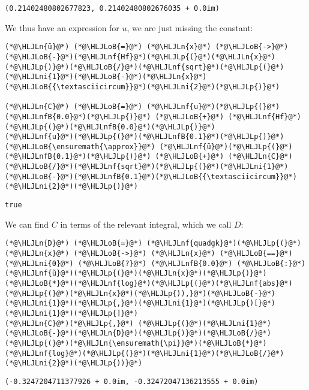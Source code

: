 \documentclass[12pt,landscape]{article}
\newcommand{\HLJLn}[1]{#1}
\newcommand{\HLJLnf}[1]{\textcolor[RGB]{66,102,213}{#1}}
\newcommand{\HLJLnfB}[1]{\textcolor[RGB]{59,151,46}{#1}}
\newcommand{\HLJLni}[1]{\textcolor[RGB]{59,151,46}{#1}}
\newcommand{\HLJLoB}[1]{\textcolor[RGB]{102,102,102}{\textbf{#1}}}
\newcommand{\HLJLp}[1]{#1}
\begin{document}
{\begin{lstlisting}
(0.21402480802677823, 0.21402480802676035 + 0.0im)
\end{lstlisting}


We thus have an expression for $u$, we are just missing the constant:


\begin{lstlisting}
(*@\HLJLn{ũ}@*) (*@\HLJLoB{=}@*) (*@\HLJLn{x}@*) (*@\HLJLoB{->}@*) (*@\HLJLoB{-}@*)(*@\HLJLnf{Hf}@*)(*@\HLJLp{(}@*)(*@\HLJLn{x}@*)(*@\HLJLp{)}@*)(*@\HLJLoB{/}@*)(*@\HLJLnf{sqrt}@*)(*@\HLJLp{(}@*)(*@\HLJLni{1}@*)(*@\HLJLoB{-}@*)(*@\HLJLn{x}@*)(*@\HLJLoB{{\textasciicircum}}@*)(*@\HLJLni{2}@*)(*@\HLJLp{)}@*)

(*@\HLJLn{C}@*) (*@\HLJLoB{=}@*) (*@\HLJLnf{u}@*)(*@\HLJLp{(}@*)(*@\HLJLnfB{0.0}@*)(*@\HLJLp{)}@*) (*@\HLJLoB{+}@*) (*@\HLJLnf{Hf}@*)(*@\HLJLp{(}@*)(*@\HLJLnfB{0.0}@*)(*@\HLJLp{)}@*)
(*@\HLJLnf{u}@*)(*@\HLJLp{(}@*)(*@\HLJLnfB{0.1}@*)(*@\HLJLp{)}@*) (*@\HLJLoB{\ensuremath{\approx}}@*) (*@\HLJLnf{ũ}@*)(*@\HLJLp{(}@*)(*@\HLJLnfB{0.1}@*)(*@\HLJLp{)}@*) (*@\HLJLoB{+}@*) (*@\HLJLn{C}@*)(*@\HLJLoB{/}@*)(*@\HLJLnf{sqrt}@*)(*@\HLJLp{(}@*)(*@\HLJLni{1}@*)(*@\HLJLoB{-}@*)(*@\HLJLnfB{0.1}@*)(*@\HLJLoB{{\textasciicircum}}@*)(*@\HLJLni{2}@*)(*@\HLJLp{)}@*)
\end{lstlisting}

\begin{lstlisting}
true
\end{lstlisting}


We can find $C$ in terms of the relevant integral, which we call $D$:


\begin{lstlisting}
(*@\HLJLn{D}@*) (*@\HLJLoB{=}@*) (*@\HLJLnf{quadgk}@*)(*@\HLJLp{(}@*)(*@\HLJLn{x}@*) (*@\HLJLoB{->}@*) (*@\HLJLn{x}@*) (*@\HLJLoB{==}@*) (*@\HLJLni{0}@*) (*@\HLJLoB{?}@*) (*@\HLJLnfB{0.0}@*) (*@\HLJLoB{:}@*) (*@\HLJLnf{ũ}@*)(*@\HLJLp{(}@*)(*@\HLJLn{x}@*)(*@\HLJLp{)}@*)(*@\HLJLoB{*}@*)(*@\HLJLnf{log}@*)(*@\HLJLp{(}@*)(*@\HLJLnf{abs}@*)(*@\HLJLp{(}@*)(*@\HLJLn{x}@*)(*@\HLJLp{)),}@*)(*@\HLJLoB{-}@*)(*@\HLJLni{1}@*)(*@\HLJLp{,}@*)(*@\HLJLni{1}@*)(*@\HLJLp{)[}@*)(*@\HLJLni{1}@*)(*@\HLJLp{]}@*)
(*@\HLJLn{C}@*)(*@\HLJLp{,}@*) (*@\HLJLp{(}@*)(*@\HLJLni{1}@*)(*@\HLJLoB{-}@*)(*@\HLJLn{D}@*)(*@\HLJLp{)}@*)(*@\HLJLoB{/}@*)(*@\HLJLp{(}@*)(*@\HLJLn{\ensuremath{\pi}}@*)(*@\HLJLoB{*}@*)(*@\HLJLnf{log}@*)(*@\HLJLp{(}@*)(*@\HLJLni{1}@*)(*@\HLJLoB{/}@*)(*@\HLJLni{2}@*)(*@\HLJLp{))}@*)
\end{lstlisting}

\begin{lstlisting}
(-0.3247204711377926 + 0.0im, -0.32472047136213555 + 0.0im)
\end{lstlisting}


}
\end{document}
